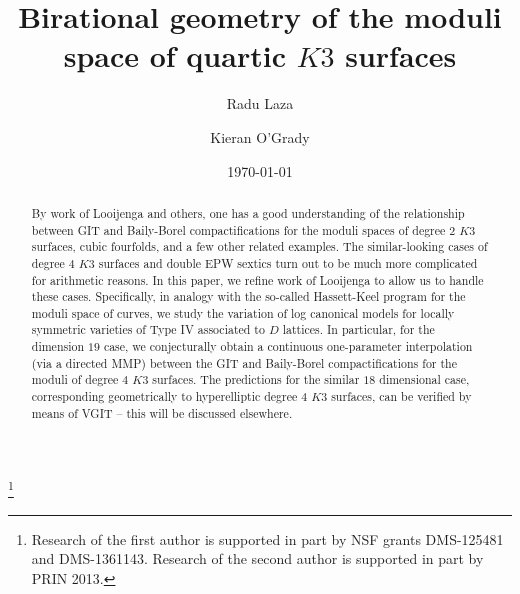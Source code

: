 \documentclass[11pt]{amsart}
\numberwithin{equation}{subsection}
\theoremstyle{plain}
\theoremstyle{remark}
\theoremstyle{definition}
\begin{document}
 \title[Moduli of quartic $K3$s]{Birational geometry of the moduli space of quartic $K3$ surfaces }
 
 \author[R. Laza]{Radu Laza}
\address{Stony Brook University,  Stony Brook, NY 11794, USA}

 \author[K. O'Grady]{Kieran O'Grady}
\address{``Sapienza'' Universit\'a di Roma, Rome, Italy}
\date{\today}
\begin{abstract}
By work of Looijenga and others, one has a good understanding of the relationship between GIT and  Baily-Borel compactifications for the moduli spaces of degree $2$ $K3$ surfaces, cubic fourfolds, and a few other related examples. The similar-looking cases of degree $4$ $K3$ surfaces and double EPW sextics  turn out to be much more complicated for arithmetic reasons. In this paper, we refine work of Looijenga to allow us to handle these cases. Specifically, in analogy with the so-called Hassett-Keel program for the moduli space of curves, we study the variation of log canonical models for locally symmetric varieties of Type IV associated to $D$ lattices. In particular, for the dimension $19$ case, we conjecturally obtain a continuous one-parameter interpolation (via a directed MMP) between the GIT and Baily-Borel compactifications for the moduli of  degree $4$ $K3$ surfaces. The predictions for the similar $18$ dimensional case, corresponding geometrically to hyperelliptic degree $4$ $K3$ surfaces, can be verified by means of VGIT -- this will be discussed elsewhere.
\end{abstract}

\thanks{Research of the first author is supported in part by NSF grants DMS-125481 and DMS-1361143. Research of the second author is supported in part by PRIN 2013.}
  \maketitle
  
  
\end{document}
